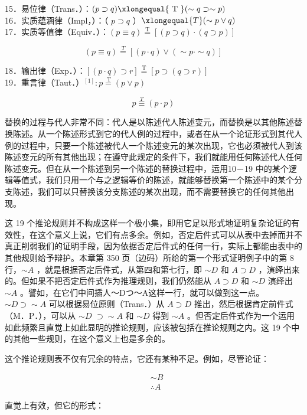 15．易位律（Trans．）：$(p \supset q) \xlongequal{\text { T }}(\sim q \supset \sim p)$\\
16．实质蕴涵律（Impl，）：（ $p \supset q$ ）$\xlongequal{T}(\sim p \vee q)$\\
17．实质等值律（Equiv．）：$(p \equiv q) \stackrel{\mathrm{T}}{=}[(p \supset q) \cdot(q \supset p)]$

$$
(p \equiv q) \stackrel{T}{=}[(p \cdot q) \vee(\sim p \cdot \sim q)]
$$

18．输出律（Exp．）：$[(p \cdot q) \supset r] \stackrel{\mathrm{T}}{=}[p \supset(q \supset r)]$\\
19．重言律（Taut．）${ }^{[1]}: p \stackrel{\mathrm{~T}}{=}(p \vee p)$

$$
p \stackrel{T}{\equiv}(p \cdot p)
$$

替换的过程与代人非常不同：代人是以陈述代人陈述变元，而替换是以其他陈述替换陈述。从一个陈述形式到它的代人例的过程中，或者在从一个论证形式到其代人例的过程中，只要一个陈述被代人一个陈述变元的某次出现，它也必须被代人到该陈述变元的所有其他出现；在遵守此规定的条件下，我们就能用任何陈述代人任何陈述变元。但在从一个陈述到另一个陈述的替换过程中，运用10－19 中的某个逻辑等值式，我们只用一个与之逻辑等价的陈述，就能够替换第一个陈述中的某个分支陈述，我们可以只替换该分支陈述的某次出现，而不需要替换它的任何其他出现。

这 19 个推论规则并不构成这样一个极小集，即用它足以形式地证明复杂论证的有效性，在这个意义上说，它们有点多余。例如，否定后件式可以从表中去掉而并不真正削弱我们的证明手段，因为依据否定后件式的任何一行，实际上都能由表中的其他规则给予辩护。本章第 350 页（边码）所给的第一个形式证明例子中的第 8 行，$\sim A$ ，就是根据否定后件式，从第四和第七行，即 $\sim D$ 和 $A \supset D$ ，演绎出来的。但如果不把否定后件式作为推理规则，我们仍然能从 $A \supset D$ 和 $\sim D$ 演绎出 $\sim A$ 。譬如，在它们中间插人～Dつ～A这样一行，就可以做到这一点。 $\sim D \supset \sim A$ 可以根据易位原则（Trans．）从 $A \supset D$ 推出，然后根据肯定前件式（M．P．），可以从 $\sim D$ $\supset \sim A$ 和 $\sim D$ 得到 $\sim A$ 。但否定后件式作为一个运用如此频繁且直觉上如此显明的推论规则，应该被包括在推论规则之内。这 19 个中的其他一些规则，在这个意义上也是多余的。

这个推论规则表不仅有冗余的特点，它还有某种不足。例如，尽管论证：

$$
\begin{aligned}
& \sim B \\
& \therefore A
\end{aligned}
$$

直觉上有效，但它的形式：

